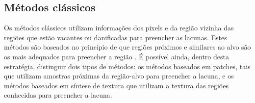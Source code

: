 \subsection{Métodos clássicos} \label{patch}
Os métodos clássicos utilizam informações dos pixels e da região vizinha das regiões que estão vacantes ou danificadas para preencher as lacunas. Estes métodos são baseados no princípio de que regiões próximos e similares ao alvo são os mais adequados para preencher a região \cite{patchmatch2009, Bertalmio2001navier}. É possível ainda, dentro desta estratégia, distinguir dois tipos de métodos: os métodos baseados em patches, tais que utilizam amostras próximas da região-alvo para preencher a lacuna, e os métodos baseados em síntese de textura que utilizam a textura das regiões conhecidas para preencher a lacuna.

